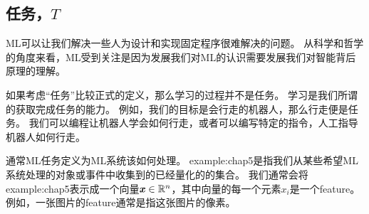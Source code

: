 \subsection{任务，$T$}
\label{sec:the_task_t}
\gls{ML}可以让我们解决一些人为设计和实现固定程序很难解决的问题。
从科学和哲学的角度来看，\gls{ML}受到关注是因为发展我们对\gls{ML}的认识需要发展我们对智能背后原理的理解。

如果考虑``任务''比较正式的定义，那么学习的过程并不是任务。
学习是我们所谓的获取完成任务的能力。
例如，我们的目标是会行走的机器人，那么行走便是任务。
我们可以编程让机器人学会如何行走，或者可以编写特定的指令，人工指导机器人如何行走。

通常\gls{ML}任务定义为\gls{ML}系统该如何处理。
\gls{example:chap5}是指我们从某些希望\gls{ML}系统处理的对象或事件中收集到的已经量化的的集合。
我们通常会将\gls{example:chap5}表示成一个向量$\boldsymbol{\mathit{x}}\in\mathbb{R}^n$，其中向量的每一个元素$x_i$是一个\gls{feature}。
例如，一张图片的\gls{feature}通常是指这张图片的像素。


